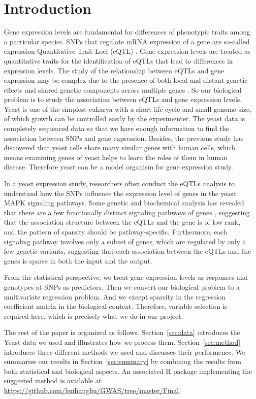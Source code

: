 \section{Introduction}

Gene expression levels are fundamental for differences of phenotypic traits among a particular species. SNPs that regulate mRNA expression of a gene are so-called expression Quantitative Trait Loci (eQTL) \citep{schadt2003genetics}. Gene expression levels are treated as quantitative traits for the identification of eQTLs that lead to differences in expression levels.  The study of the relationship between  eQTLs and gene expression may be complex due to the presence of both local and distant genetic effects and shared genetic components across multiple genes \cite{brem2005landscape, cai2012covariate}.  So our biological problem is to study the association between eQTLs and gene expression levels.  Yeast is one of the simplest eukarya with a short life cycle and small genome size, of which growth can be controlled easily by the experimenter. The yeast data is completely sequenced data so that we have enough information to find the association between SNPs and gene expression. Besides, the previous study has discovered that yeast cells share many similar genes with human cells, which means examining genes of yeast helps to learn the roles of them in human disease. Therefore yeast can be a model organism for gene expression study.

In a yeast expression study, researchers often conduct the eQTLs analysis to understand how the SNPs influence the expression level of genes in the yeast MAPK signaling pathways. Some genetic and biochemical analysis has revealed that there are a few functionally distinct signaling pathways of genes \citep{gustin1998map, brem2005landscape}, suggesting that the association structure between the eQTLs and the gene is of low rank, and the pattern of sparsity should be pathway-specific. Furthermore, each signaling pathway involves only a subset of genes, which are regulated by only a few genetic variants, suggesting that each association between the eQTLs and the genes is sparse in both the input and the output. 

From the statistical perspective, we treat gene expression levels as responses and genotypes at SNPs as predictors. Then we convert our biological problem to a multivariate regression problem. And we except sparsity in the regression coefficient matrix in the biological context. Therefore, variable selection is required here, which is precisely what we do in our project.

The rest of the paper is organized as follows. 
Section~\ref{sec:data} introduces the Yeast data we used and illustrates how we process them. 
Section~\ref{sec:method}  introduces three different methods we used and discusses their performence. 
We summarize our results in Section~\ref{sec:summary} by combining the results from both statistical and biological aspects.
An associated R package implementing the suggested method is available at \url{https://github.com/huihangliu/GWAS/tree/master/Final}. 

